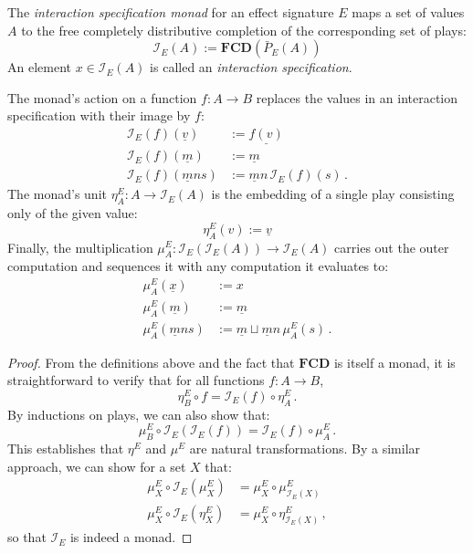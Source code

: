 \documentclass[sigplan,screen]{acmart}
\begin{document}
\begin{definition} \label{def:intm} %
The \emph{interaction specification monad}
for an effect signature $E$
maps a set of values $A$
to the free completely distributive completion
of the corresponding set of plays:
\[
    \mathcal{I}_E(A) :=
      \mathbf{FCD}(\bar{P}_E(A))
\]
An element $x \in \mathcal{I}_E(A)$ is called
an \emph{interaction specification}.

The monad's action on a function $f : A \rightarrow B$
replaces the values in
an interaction specification with their image by $f$:
\begin{align*}
  \mathcal{I}_E(f)(\underline{v}) &:= \underline{f(v)} \\
  \mathcal{I}_E(f)(\underline{m}) &:= \underline{m} \\
  \mathcal{I}_E(f)(\underline{m} n s) &:=
    \underline{m} n \, \mathcal{I}_E(f)(s) \,.
\end{align*}
The monad's unit
$\eta^E_A : A \rightarrow \mathcal{I}_E(A)$
is the embedding of a single play
consisting only of the given value:
\[
    \eta^E_A(v) := \underline{v}
\]
Finally, the multiplication
$\mu^E_A : \mathcal{I}_E(\mathcal{I}_E(A)) \rightarrow \mathcal{I}_E(A)$
carries out the outer computation and
sequences it with any computation it evaluates to:
\begin{align*}
  \mu^E_A(\underline{x}) &:= x \\
  \mu^E_A(\underline{m}) &:= \underline{m} \\
  \mu^E_A(\underline{m} n s) &:=
    \underline{m} \sqcup \underline{m} n \, \mu^E_A(s) \,.
\end{align*}

\begin{proof} %
From the definitions above and
the fact that $\mathbf{FCD}$ is itself a monad,
it is straightforward to verify that
for all functions $f : A \rightarrow B$,
\[
    \eta^E_B \circ f = \mathcal{I}_E(f) \circ \eta^E_A \,.
\]
By inductions on plays, we can also show that:
\[
    \mu^E_B \circ \mathcal{I}_E(\mathcal{I}_E(f)) =
      \mathcal{I}_E(f) \circ \mu^E_A \,.
\]
This establishes that $\eta^E$ and $\mu^E$
are natural transformations.
By a similar approach,
we can show for a set $X$ that:
\begin{align*}
  \mu^E_X \circ \mathcal{I}_E(\mu^E_X) &=
    \mu^E_X \circ \mu^E_{\mathcal{I}_E(X)} \\
  \mu^E_X \circ \mathcal{I}_E(\eta^E_X) &=
    \mu^E_X \circ \eta^E_{\mathcal{I}_E(X)} \,,
\end{align*}
so that $\mathcal{I}_E$ is indeed a monad.
\end{proof}
\end{definition}
\end{document}
